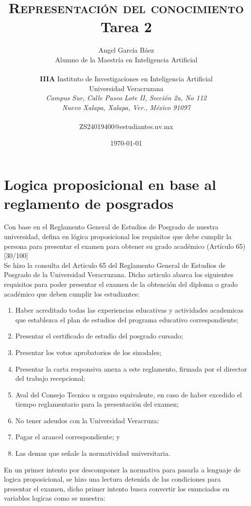 \documentclass[11pt, letterpaper]{article}
\title{\textsc{Representación del conocimiento} \\
	Tarea 2
}
\author{Angel García Báez\\
	Alumno de la Maestría en Inteligencia Artificial \\ \\ \textbf{IIIA}
	Instituto de Investigaciones en Inteligencia Artificial \\
	Universidad Veracruzana \\ \emph{Campus Sur, Calle Paseo Lote II,
		Sección 2a, No 112} \\ \emph{Nuevo Xalapa, Xalapa, Ver., México 91097}
	\\ \\ ZS24019400@estudiantes.uv.mx}
\date{\today}
\begin{document}
	
	\maketitle

	\newpage
	
	\section{Logica proposicional en base al reglamento de posgrados}
	
	Con base en el Reglamento General de Estudios de Posgrado de nuestra
	universidad, defina en lógica proposicional los requisitos que debe cumplir la
	persona para presentar el examen para obtener su grado académico (Artículo
	65)[30/100] \\
	
	Se hizo la consulta del Articulo 65 del Reglamento General de Estudios de Posgrado de la Universidad Veracruzana. Dicho articulo abarca los siguientes requisitos para poder presentar el examen de la obtención del diploma o grado académico que deben cumplir los estudiantes:
	
	\begin{enumerate}[I]
		\item Haber acreditado todas las experiencias educativas y actividades academicas que establezca el plan de estudios del programa educativo correspondiente;		
		\item Presentar el certificado de estudio del posgrado cursado;
		\item Presentar los votos aprobatorios de los sinodales;
		\item Presentar la carta responsiva anexa a este reglamento, firmada por el director del trabajo recepcional;
		\item Aval del Consejo Tecnico u organo equivalente, en caso de haber excedido el tiempo reglamentario para la presentación del examen;
		\item No tener adeudos con la Universidad Veracruza;
		\item Pagar el arancel correspondiente; y
		\item Las demas que señale la normatividad universitaria.		
	\end{enumerate}
	
	\newpage 
	
	En un primer intento por descomponer la normativa para pasarla a lenguaje de logica proposicional, se hizo una lectura detenida de las condiciones para presentar el examen, dicho primer intento busca convertir los enunciados en variables logicas como se muestra:
	
\end{document}
